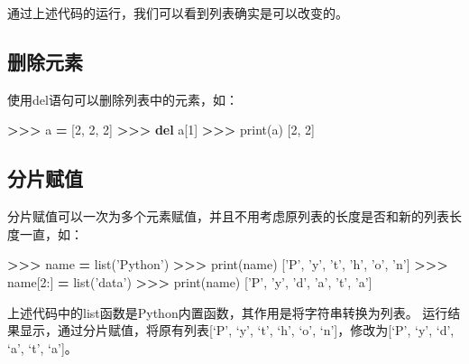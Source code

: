 \documentclass[]{ctexbook}
\newenvironment{Shaded}{\begin{snugshade}}{\end{snugshade}}
\newcommand{\BuiltInTok}[1]{#1}
\newcommand{\DecValTok}[1]{\textcolor[rgb]{0.00,0.00,0.81}{#1}}
\newcommand{\KeywordTok}[1]{\textcolor[rgb]{0.13,0.29,0.53}{\textbf{#1}}}
\newcommand{\NormalTok}[1]{#1}
\newcommand{\OperatorTok}[1]{\textcolor[rgb]{0.81,0.36,0.00}{\textbf{#1}}}
\newcommand{\StringTok}[1]{\textcolor[rgb]{0.31,0.60,0.02}{#1}}
\begin{document}
通过上述代码的运行，我们可以看到列表确实是可以改变的。

\hypertarget{ux5220ux9664ux5143ux7d20}{%
\subsection{删除元素}\label{ux5220ux9664ux5143ux7d20}}

使用del语句可以删除列表中的元素，如：

\begin{Shaded}
\begin{Highlighting}[]
\OperatorTok{>>>}\NormalTok{ a }\OperatorTok{=}\NormalTok{ [}\DecValTok{2}\NormalTok{, }\DecValTok{2}\NormalTok{, }\DecValTok{2}\NormalTok{]}
\OperatorTok{>>>} \KeywordTok{del}\NormalTok{ a[}\DecValTok{1}\NormalTok{]}
\OperatorTok{>>>} \BuiltInTok{print}\NormalTok{(a)}
\NormalTok{[}\DecValTok{2}\NormalTok{, }\DecValTok{2}\NormalTok{]}
\end{Highlighting}
\end{Shaded}

\hypertarget{ux5206ux7247ux8d4bux503c}{%
\subsection{分片赋值}\label{ux5206ux7247ux8d4bux503c}}

分片赋值可以一次为多个元素赋值，并且不用考虑原列表的长度是否和新的列表长度一直，如：

\begin{Shaded}
\begin{Highlighting}[]
\OperatorTok{>>>}\NormalTok{ name }\OperatorTok{=} \BuiltInTok{list}\NormalTok{(}\StringTok{'Python'}\NormalTok{)}
\OperatorTok{>>>} \BuiltInTok{print}\NormalTok{(name)}
\NormalTok{[}\StringTok{'P'}\NormalTok{, }\StringTok{'y'}\NormalTok{, }\StringTok{'t'}\NormalTok{, }\StringTok{'h'}\NormalTok{, }\StringTok{'o'}\NormalTok{, }\StringTok{'n'}\NormalTok{]}
\OperatorTok{>>>}\NormalTok{ name[}\DecValTok{2}\NormalTok{:] }\OperatorTok{=} \BuiltInTok{list}\NormalTok{(}\StringTok{'data'}\NormalTok{)}
\OperatorTok{>>>} \BuiltInTok{print}\NormalTok{(name)}
\NormalTok{[}\StringTok{'P'}\NormalTok{, }\StringTok{'y'}\NormalTok{, }\StringTok{'d'}\NormalTok{, }\StringTok{'a'}\NormalTok{, }\StringTok{'t'}\NormalTok{, }\StringTok{'a'}\NormalTok{]}
\end{Highlighting}
\end{Shaded}

上述代码中的list函数是Python内置函数，其作用是将字符串转换为列表。
运行结果显示，通过分片赋值，将原有列表{[}`P', `y', `t', `h', `o', `n'{]}，修改为{[}`P', `y', `d', `a', `t', `a'{]}。
\end{document}
